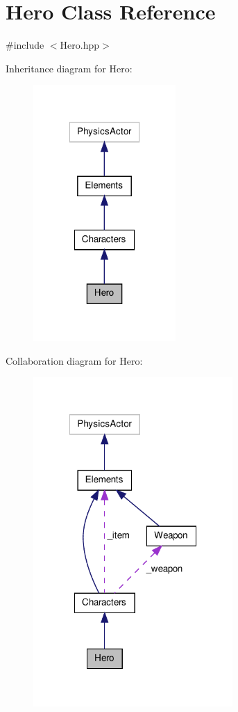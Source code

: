 \hypertarget{class_hero}{\section{Hero Class Reference}
\label{class_hero}
}


{\ttfamily \#include $<$Hero.\-hpp$>$}



Inheritance diagram for Hero\-:
\nopagebreak
\begin{figure}[H]
\begin{center}
\leavevmode
\includegraphics[width=154pt]{class_hero__inherit__graph}
\end{center}
\end{figure}


Collaboration diagram for Hero\-:
\nopagebreak
\begin{figure}[H]
\begin{center}
\leavevmode
\includegraphics[width=215pt]{class_hero__coll__graph}
\end{center}
\end{figure}
